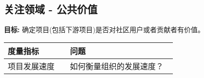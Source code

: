 
    \subsection{关注领域 - 公共价值}
    \textbf{目标:} 确定项目(包括下游项目)是否对社区用户或者贡献者有价值。
    \begin{table}[ht!]
        \centering
        \begin{tabular}{|p{0.35\linewidth} | p{0.6\linewidth}|}
            \hline
            \hfil \textbf{度量指标}  & \hfil \textbf{问题} \\
            \hline
        		项目发展速度 & 如何衡量组织的发展速度？ \\ 
		\hline
    \end{tabular}
    \end{table}
        
 

